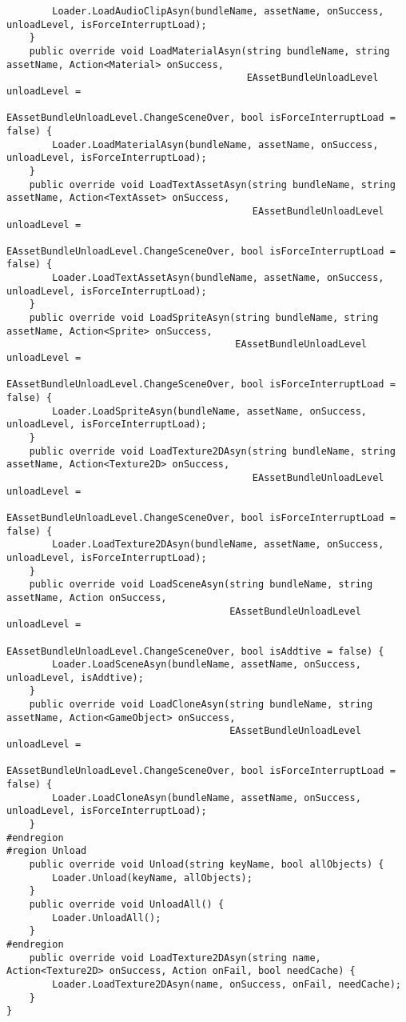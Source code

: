 \documentclass[9pt, b5paper]{article}
\begin{document}
\begin{verbatim}
        Loader.LoadAudioClipAsyn(bundleName, assetName, onSuccess, unloadLevel, isForceInterruptLoad);
    }
    public override void LoadMaterialAsyn(string bundleName, string assetName, Action<Material> onSuccess, 
                                          EAssetBundleUnloadLevel unloadLevel = 
                                          EAssetBundleUnloadLevel.ChangeSceneOver, bool isForceInterruptLoad = false) {
        Loader.LoadMaterialAsyn(bundleName, assetName, onSuccess, unloadLevel, isForceInterruptLoad);
    }
    public override void LoadTextAssetAsyn(string bundleName, string assetName, Action<TextAsset> onSuccess, 
                                           EAssetBundleUnloadLevel unloadLevel = 
                                           EAssetBundleUnloadLevel.ChangeSceneOver, bool isForceInterruptLoad = false) {
        Loader.LoadTextAssetAsyn(bundleName, assetName, onSuccess, unloadLevel, isForceInterruptLoad);
    }
    public override void LoadSpriteAsyn(string bundleName, string assetName, Action<Sprite> onSuccess, 
                                        EAssetBundleUnloadLevel unloadLevel = 
                                        EAssetBundleUnloadLevel.ChangeSceneOver, bool isForceInterruptLoad = false) {
        Loader.LoadSpriteAsyn(bundleName, assetName, onSuccess, unloadLevel, isForceInterruptLoad);
    }
    public override void LoadTexture2DAsyn(string bundleName, string assetName, Action<Texture2D> onSuccess, 
                                           EAssetBundleUnloadLevel unloadLevel = 
                                           EAssetBundleUnloadLevel.ChangeSceneOver, bool isForceInterruptLoad = false) {
        Loader.LoadTexture2DAsyn(bundleName, assetName, onSuccess, unloadLevel, isForceInterruptLoad);
    }
    public override void LoadSceneAsyn(string bundleName, string assetName, Action onSuccess, 
                                       EAssetBundleUnloadLevel unloadLevel = 
                                       EAssetBundleUnloadLevel.ChangeSceneOver, bool isAddtive = false) {
        Loader.LoadSceneAsyn(bundleName, assetName, onSuccess, unloadLevel, isAddtive);
    }
    public override void LoadCloneAsyn(string bundleName, string assetName, Action<GameObject> onSuccess, 
                                       EAssetBundleUnloadLevel unloadLevel = 
                                       EAssetBundleUnloadLevel.ChangeSceneOver, bool isForceInterruptLoad = false) {
        Loader.LoadCloneAsyn(bundleName, assetName, onSuccess, unloadLevel, isForceInterruptLoad);
    }
#endregion
#region Unload
    public override void Unload(string keyName, bool allObjects) {
        Loader.Unload(keyName, allObjects);
    }
    public override void UnloadAll() {
        Loader.UnloadAll();
    }
#endregion
    public override void LoadTexture2DAsyn(string name, Action<Texture2D> onSuccess, Action onFail, bool needCache) {
        Loader.LoadTexture2DAsyn(name, onSuccess, onFail, needCache);
    }
}
\end{verbatim}
\end{document}
